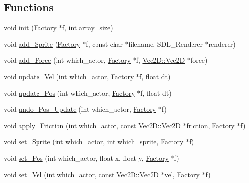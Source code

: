 \subsection*{Functions}
\begin{DoxyCompactItemize}
\item 
void \mbox{\hyperlink{namespace_actor_a66160c0692dd16998f8d7dd47ef575c1}{init}} (\mbox{\hyperlink{struct_actor_1_1_factory}{Factory}} $\ast$f, int array\+\_\+size)
\item 
void \mbox{\hyperlink{namespace_actor_ac479244aa3bada035abc9548ba604bfb}{add\+\_\+\+Sprite}} (\mbox{\hyperlink{struct_actor_1_1_factory}{Factory}} $\ast$f, const char $\ast$filename, S\+D\+L\+\_\+\+Renderer $\ast$renderer)
\item 
void \mbox{\hyperlink{namespace_actor_aa499e89c5134fa9a58be884101247d60}{add\+\_\+\+Force}} (int which\+\_\+actor, \mbox{\hyperlink{struct_actor_1_1_factory}{Factory}} $\ast$f, \mbox{\hyperlink{struct_vec2_d_1_1_vec2_d}{Vec2\+D\+::\+Vec2D}} $\ast$force)
\item 
void \mbox{\hyperlink{namespace_actor_a820206ab30a4a0fb3f37d78669598fdb}{update\+\_\+\+Vel}} (int which\+\_\+actor, \mbox{\hyperlink{struct_actor_1_1_factory}{Factory}} $\ast$f, float dt)
\item 
void \mbox{\hyperlink{namespace_actor_af6f7f45737ca4f6e33584d352d0e542c}{update\+\_\+\+Pos}} (int which\+\_\+actor, \mbox{\hyperlink{struct_actor_1_1_factory}{Factory}} $\ast$f, float dt)
\item 
void \mbox{\hyperlink{namespace_actor_aa3ad0815b411b389fc1fef70ece978e9}{undo\+\_\+\+Pos\+\_\+\+Update}} (int which\+\_\+actor, \mbox{\hyperlink{struct_actor_1_1_factory}{Factory}} $\ast$f)
\item 
void \mbox{\hyperlink{namespace_actor_aed5de159bbc7075229cbf6e187d906c7}{apply\+\_\+\+Friction}} (int which\+\_\+actor, const \mbox{\hyperlink{struct_vec2_d_1_1_vec2_d}{Vec2\+D\+::\+Vec2D}} $\ast$friction, \mbox{\hyperlink{struct_actor_1_1_factory}{Factory}} $\ast$f)
\item 
void \mbox{\hyperlink{namespace_actor_a62906af5de2990ca58baae369a2912fc}{set\+\_\+\+Sprite}} (int which\+\_\+actor, int which\+\_\+sprite, \mbox{\hyperlink{struct_actor_1_1_factory}{Factory}} $\ast$f)
\item 
void \mbox{\hyperlink{namespace_actor_af9c730185b601f67cc9aa44beb2b3e2a}{set\+\_\+\+Pos}} (int which\+\_\+actor, float x, float y, \mbox{\hyperlink{struct_actor_1_1_factory}{Factory}} $\ast$f)
\item 
void \mbox{\hyperlink{namespace_actor_a6cbf0e6df03f13dda762a664c4b8170d}{set\+\_\+\+Vel}} (int which\+\_\+actor, const \mbox{\hyperlink{struct_vec2_d_1_1_vec2_d}{Vec2\+D\+::\+Vec2D}} $\ast$vel, \mbox{\hyperlink{struct_actor_1_1_factory}{Factory}} $\ast$f)

\end{DoxyCompactItemize}
